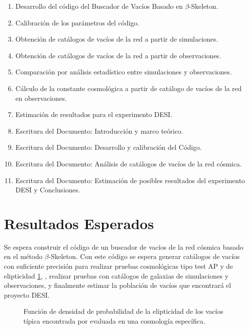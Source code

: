 \documentclass[preprint]{aastex62}
\begin{document}
  
  \begin{enumerate}
  \item Desarrollo del código del Buscador de Vacíos Basado en $\beta$-Skeleton.
  \item Calibración de los parámetros del código.
  \item Obtención de catálogos de vacíos de la red a partir de simulaciones.
  \item Obtención de catálogos de vacíos de la red a partir de observaciones.
  \item Comparación por análisis estadístico entre simulaciones y observaciones.
  \item Cálculo de la constante cosmológica a partir de catálogo de vacíos de la red en
    observaciones.
  \item Estimación de resultados para el experimento DESI.
  \item Escritura del Documento: Introducción y marco teórico.
  \item Escritura del Documento: Desarrollo y calibración del Código.
  \item Escritura del Documento: Análisis de catálogos de vacíos de la red cósmica. 
  \item Escritura del Documento: Estimación de posibles resultados del experimento DESI y Conclusiones.
  \end{enumerate}
  
  \section{Resultados Esperados}

  Se espera construir el código de un buscador de vacíos de la red cósmica basado en el
  método $\beta$-Skeleton. Con este código se espera generar catálogos de vacíos con
  suficiente precisión para realizar pruebas cosmológicas tipo test AP y de elipticidad
  \ref{fig:expected_results}, \citep{Bos2012,Lavaux-Wandelt2009,Park-Lee2007},
  realizar pruebas con catálogos de galaxias de simulaciones y observaciones, y finalmente
  estimar la población de vacíos que encontrará el proyecto DESI.

  \begin{figure}
    \caption{ Función de densidad de probabilidad de la elipticidad de los vacíos típica
      encontrada por \citep{Lavaux-Wandelt2009} evaluada en una cosmología específica.
      \label{fig:expected_results}}
  \end{figure}
\end{document}
